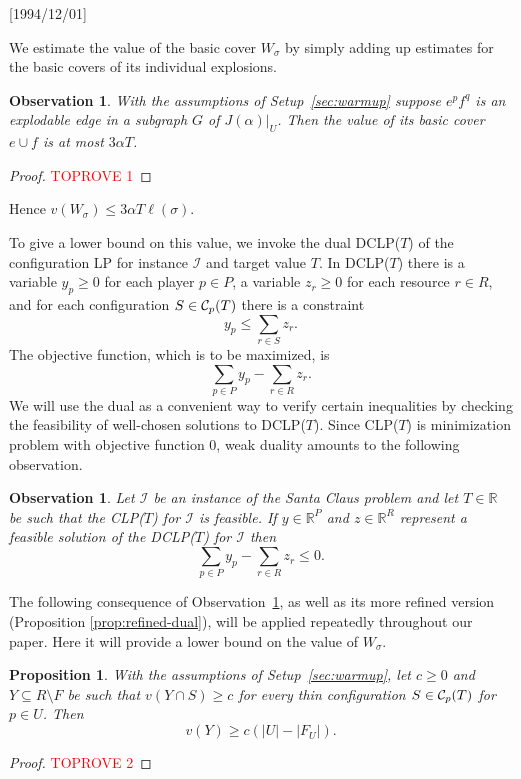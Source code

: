 \NeedsTeXFormat{LaTeX2e}[1994/12/01]\documentclass[letterpaper, 11pt]{article}
\newtheorem{prop}[thm]{Proposition}
\newtheorem{obs}[thm]{Observation}
\theoremstyle{definition}
\theoremstyle{remark}
\numberwithin{equation}{section}
\newcommand{\cI}{\mathcal{I}}
\begin{document}
We estimate the value of the basic cover $W_{\sigma}$ by simply adding
up estimates for the basic covers of its individual explosions. 
\begin{obs} \label{obs:basic} With the assumptions of
  Setup~\ref{sec:warmup} suppose $e^pf^q$ is an explodable edge in a subgraph $G$ of $J(\alpha)|_U$.
Then the value of its basic cover $e\cup f$ is at most $3\alpha T$. \end{obs}
\begin{proof}\textcolor{red}{TOPROVE 1}\end{proof}
Hence $v(W_{\sigma}) \leq 3\alpha T\ell (\sigma)$. 

To give a lower bound on this value,   we invoke the dual DCLP($T$) of the
configuration LP for instance $\cI$ and target
value $T$. 
In DCLP($T$) there is a variable $y_p\geq 0$ for each player $p\in P$, a
variable $z_r\geq 0$ for each resource $r\in R$, and for each configuration
$S\in {\cal C}_p(T)$ there is a constraint $$y_p \leq \sum_{r \in S}
z_r.$$
The objective function, which is to be maximized, is  $$\sum_{p\in P}y_p -\sum_{r\in R}z_r.$$
We will use the dual as a convenient way to verify certain inequalities by checking the feasibility of well-chosen solutions to DCLP($T$).
Since CLP($T$) is minimization problem with objective function $0$,  weak duality amounts to the following observation. 
\begin{obs}\label{obs:weak-duality}  Let $\cI$ be an instance of the Santa Claus problem and let $T\in\mathbb{R}$ be such that the CLP($T$) for $\cI$ is feasible. If $y \in \mathbb{R}^P$ and $ z \in \mathbb{R}^R$ represent a feasible solution of the DCLP($T$) for $\cI$ then $$\sum_{p\in P}y_p - \sum_{r\in R}z_r \leq 0.$$
\end{obs}
 
The following consequence of Observation~\ref{obs:weak-duality}, as well as its more refined version (Proposition \ref{prop:refined-dual}), will be applied repeatedly throughout our paper. Here it will provide a lower bound on the value of $W_{\sigma}$.

\begin{prop}\label{prop:dual} With the assumptions of
    Setup~\ref{sec:warmup}, let $c\geq 0$ and 
  $Y\subseteq R\setminus F$ be such that $v(Y\cap S) \geq 
  c$ for every thin configuration $S \in {\cal C}_p(T)$ for $p\in U$.
  Then 
$$v(Y) \geq c (|U|-|F_U|).$$
\end{prop}

\begin{proof}\textcolor{red}{TOPROVE 2}\end{proof}
\end{document}
